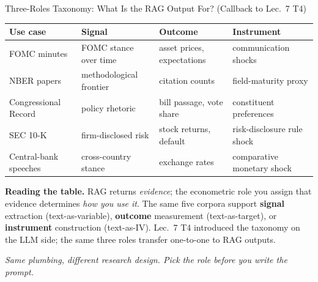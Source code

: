 \begin{frame}{Three-Roles Taxonomy: What Is the RAG Output For? (Callback to Lec.\ 7 T4)}
\small
\begin{center}
\renewcommand{\arraystretch}{1.3}
\begin{tabular}{|p{2.7cm}|p{2.9cm}|p{2.9cm}|p{2.9cm}|}
\hline
\textbf{Use case} & \textbf{Signal} & \textbf{Outcome} & \textbf{Instrument} \\
\hline
FOMC minutes & FOMC stance over time & asset prices, expectations & communication shocks \\
\hline
NBER papers & methodological frontier & citation counts & field-maturity proxy \\
\hline
Congressional Record & policy rhetoric & bill passage, vote share & constituent preferences \\
\hline
SEC 10-K & firm-disclosed risk & stock returns, default & risk-disclosure rule shock \\
\hline
Central-bank speeches & cross-country stance & exchange rates & comparative monetary shock \\
\hline
\end{tabular}
\end{center}

\medskip
\textbf{Reading the table.} RAG returns \emph{evidence}; the econometric role you assign that evidence determines \emph{how you use it}. The same five corpora support \textbf{signal} extraction (text-as-variable), \textbf{outcome} measurement (text-as-target), or \textbf{instrument} construction (text-as-IV). Lec.\ 7 T4 introduced the taxonomy on the LLM side; the same three roles transfer one-to-one to RAG outputs.

\medskip
\textit{Same plumbing, different research design. Pick the role before you write the prompt.}
\end{frame}

